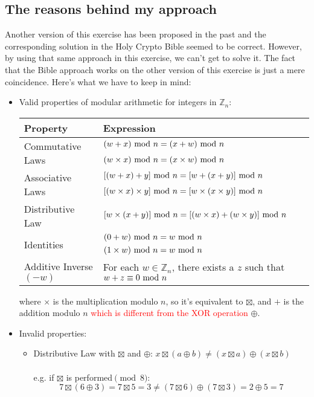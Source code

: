 \subsection{The reasons behind my approach}
Another version of this exercise has been proposed in the past and the corresponding solution in the Holy Crypto Bible seemed to be correct. However, by using that same approach in this exercise, we can't get to solve it. The fact that the Bible approach works on the other version of this exercise is just a mere coincidence. Here's what we have to keep in mind:
\begin{itemize}
    \item Valid properties of modular arithmetic for integers in $\mathbb{Z}_n$:
    \begin{center}
        \bgroup
        \def\arraystretch{1.5}
        \begin{tabular}{|l|l|}
            \hline
            \textbf{Property} & \textbf{Expression}\\
            \hline
            \multirow{2}{*}{Commutative Laws} & $(w+x)\text{ mod } n=(x+w)\text{ mod } n$\\
            & $(w\times x)\text{ mod } n = (x\times w)\text{ mod } n$\\
            \hline
            \multirow{2}{*}{Associative Laws} & $[(w+x)+y]\text{ mod } n=[w+(x+y)]\text{ mod } n$\\
            & $[(w\times x)\times y]\text{ mod } n=[w\times (x\times y)]\text{ mod } n$\\
            \hline
            Distributive Law & $[w\times(x+y)]\text{ mod } n=[(w\times x)+(w\times y)]\text{ mod } n$\\
            \hline
            \multirow{2}{*}{Identities} & $(0+w)\text{ mod } n=w \text{ mod } n$\\
            & $(1\times w)\text{ mod } n=w\text{ mod } n$\\
            \hline
            Additive Inverse $(-w)$ & For each $w\in\mathbb{Z}_n$, there exists a $z$ such that $w+z\equiv 0\text{ mod } n$\\
            \hline
        \end{tabular}
        \egroup
    \end{center}
    where $\times$ is the multiplication modulo $n$, so it's equivalent to $\boxtimes$, and $+$ is the addition modulo $n$ \textcolor{red}{which is different from the XOR operation} $\oplus$.
    \item Invalid properties:
    \begin{itemize}
        \item Distributive Law with $\boxtimes$ and $\oplus$: $x\boxtimes(a\oplus b)\not=(x\boxtimes a)\oplus(x\boxtimes b)$\\\\
        e.g. if $\boxtimes$ is performed$\pmod8$:
        $$7\boxtimes(6\oplus3)=7\boxtimes5=3\not=(7\boxtimes6)\oplus(7\boxtimes3)=2\oplus5=7$$
    \end{itemize}
\end{itemize}
\newpage
